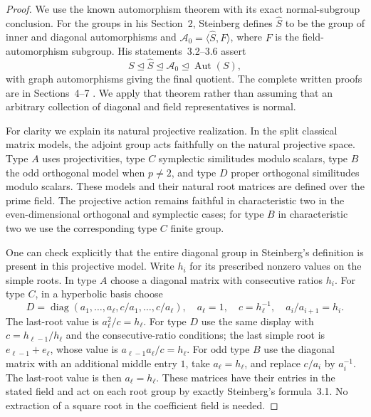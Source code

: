 \begin{proof}
We use the known automorphism theorem with its exact
normal-subgroup conclusion. For the groups in his
Section~2, Steinberg defines $\widehat S$ to be the group
of inner and diagonal automorphisms and
$\mathcal A_0=\langle\widehat S,F\rangle$, where $F$ is
the field-automorphism subgroup. His statements~3.2--3.6
assert
\[
 S\mathrel{\trianglelefteq}\widehat S
       \mathrel{\trianglelefteq}\mathcal A_0
       \mathrel{\trianglelefteq}\operatorname{Aut}(S),
                                                        \tag{D.CA.5}
\]
with graph automorphisms giving the final quotient.
The complete written proofs are in Sections~4--7
\citep[pp.~607--614, especially statements~3.2--3.6 on
p.~608 and their proofs]{Steinberg1960ClassicalAutomorphismsB}.
We apply that theorem rather than assuming that an
arbitrary collection of diagonal and field representatives
is normal.

For clarity we explain its natural projective realization.
In the split classical matrix models, the adjoint group
acts faithfully on the natural projective space. Type $A$
uses projectivities, type $C$ symplectic similitudes modulo
scalars, type $B$ the odd orthogonal model when $p\ne2$,
and type $D$ proper orthogonal similitudes modulo scalars.
These models and their natural root matrices are defined
over the prime field. The projective action remains
faithful in characteristic two in the even-dimensional
orthogonal and symplectic cases; for type $B$ in
characteristic two we use the corresponding type $C$
finite group.

One can check explicitly that the entire diagonal group
in Steinberg's definition is present in this projective
model. Write $h_i$ for its prescribed nonzero values on
the simple roots. In type $A$ choose a diagonal matrix
with consecutive ratios $h_i$. For type $C$, in a
hyperbolic basis choose
\[
 D=\operatorname{diag}(a_1,\ldots,a_\ell,
                         c/a_1,\ldots,c/a_\ell),
 \quad a_\ell=1,\quad c=h_\ell^{-1},\quad
 a_i/a_{i+1}=h_i.
                                                        \tag{D.CA.6}
\]
The last-root value is $a_\ell^2/c=h_\ell$. For type $D$
use the same display with
$c=h_{\ell-1}/h_\ell$ and the consecutive-ratio
conditions; the last simple root is
$e_{\ell-1}+e_\ell$, whose value is
$a_{\ell-1}a_\ell/c=h_\ell$.
For odd type $B$ use the diagonal matrix with an additional
middle entry $1$, take $a_\ell=h_\ell$, and replace
$c/a_i$ by $a_i^{-1}$. The last-root value is then
$a_\ell=h_\ell$. These matrices have their entries in
the stated field and act on each root group by exactly
Steinberg's formula~3.1. No extraction of a square root
in the coefficient field is needed.


\end{proof}
